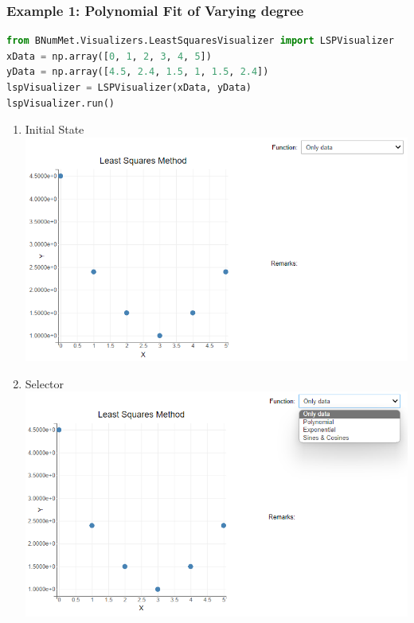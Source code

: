 \subsubsection{Example 1: Polynomial Fit of Varying degree}{
\begin{lstlisting}[language=Python]
from BNumMet.Visualizers.LeastSquaresVisualizer import LSPVisualizer
xData = np.array([0, 1, 2, 3, 4, 5])
yData = np.array([4.5, 2.4, 1.5, 1, 1.5, 2.4])
lspVisualizer = LSPVisualizer(xData, yData)
lspVisualizer.run()
\end{lstlisting}

\begin{enumerate}
    \item Initial State\\
    \includegraphics[scale=0.7]{Include/Images/Thesis/Documentation/Visualizers/LeastSquares/Example 1/Example 1 - 00 - Initial State.png}
    \item Selector\\
    \includegraphics[scale=0.7]{Include/Images/Thesis/Documentation/Visualizers/LeastSquares/Example 1/Example 1 - 00 - Selector.png}

\end{enumerate}}
